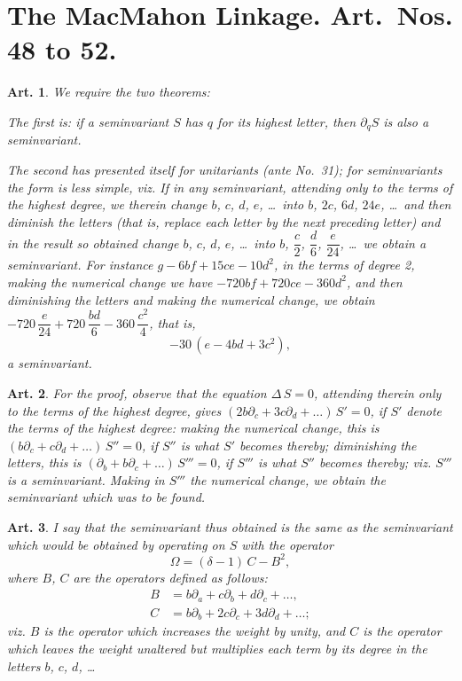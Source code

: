 \documentclass[11pt,a4paper]{article}
\theoremstyle{cayley}
\newtheorem{art}{Art.}[section]
\begin{document}
\section*{The MacMahon Linkage. Art.~Nos. \textbf{48} to \textbf{52}.}

\setcounter{art}{47}
\begin{art}
We require the two theorems:

The first is: if a seminvariant $S$ has $q$ for its highest letter, then $\partial_{q}S$ is also a seminvariant.

The second has presented itself for unitariants (\textit{ante} No.~31); for seminvariants the form is less simple, viz. If in any seminvariant, attending only to the terms of the highest degree, we therein change $b$, $c$, $d$, $e$, \ldots\ into $b$, $2c$, $6d$, $24e$, \ldots\ and then diminish the letters (that is, replace each letter by the next preceding letter) and in the result so obtained change $b$, $c$, $d$, $e$, \ldots\ into $b$, $\dfrac{c}{2}$, $\dfrac{d}{6}$, $\dfrac{e}{24}$, \ldots\ we obtain a seminvariant. For instance $g - 6bf + 15ce - 10d^{2}$, in the terms of degree 2, making the numerical change we have $-720bf + 720ce - 360d^{2}$, and then diminishing the letters and making the numerical change, we obtain $-720\,\dfrac{e}{24} + 720\,\dfrac{bd}{6} - 360\,\dfrac{c^{2}}{4}$, that is,
\[
-30\,(e - 4bd + 3c^{2}),
\]
a seminvariant.
\end{art}

\setcounter{art}{48}
\begin{art}
For the proof, observe that the equation $\Delta\,S = 0$, attending therein only to the terms of the highest degree, gives $(2b\partial_{c} + 3c\partial_{d} + \ldots)\,S' = 0$, if $S'$ denote the terms of the highest degree: making the numerical change, this is $(b\partial_{c} + c\partial_{d} + \ldots)\,S'' = 0$, if $S''$ is what $S'$ becomes thereby; diminishing the letters, this is $(\partial_{b} + b\partial_{c} + \ldots)\,S''' = 0$, if $S'''$ is what $S''$ becomes thereby; viz. $S'''$ is a seminvariant. Making in $S'''$ the numerical change, we obtain the seminvariant which was to be found.
\end{art}

\setcounter{art}{49}
\begin{art}
I say that the seminvariant thus obtained is the same as the seminvariant which would be obtained by operating on $S$ with the operator
\[
\Omega = (\delta - 1)\,C - B^{2},
\]
where $B$, $C$ are the operators defined as follows:
\begin{align*}
B &= b\partial_{a} + c\partial_{b} + d\partial_{c} + \ldots,\\
C &= b\partial_{b} + 2c\partial_{c} + 3d\partial_{d} + \ldots;
\end{align*}
viz. $B$ is the operator which increases the weight by unity, and $C$ is the operator which leaves the weight unaltered but multiplies each term by its degree in the letters $b$, $c$, $d$, \ldots
\end{art}
\end{document}
